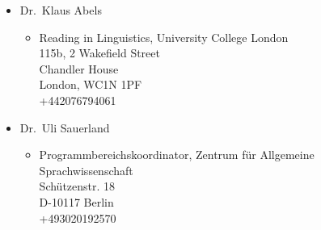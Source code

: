 \documentclass[]{article}
\providecommand{\tightlist}{%
  \setlength{\itemsep}{0pt}\setlength{\parskip}{0pt}}
\begin{document}
\begin{itemize}
\tightlist
\item
  Dr.~Klaus Abels

  \begin{itemize}
  \tightlist
  \item
    Reading in Linguistics, University College London\\
    115b, 2 Wakefield Street\\
    Chandler House\\
    London, WC1N 1PF\\
    +442076794061
  \end{itemize}
\item
  Dr.~Uli Sauerland

  \begin{itemize}
  \tightlist
  \item
    Programmbereichskoordinator, Zentrum für Allgemeine
    Sprachwissenschaft\\
    Schützenstr. 18\\
    D-10117 Berlin\\
    +493020192570
  \end{itemize}
\end{itemize}
\end{document}

